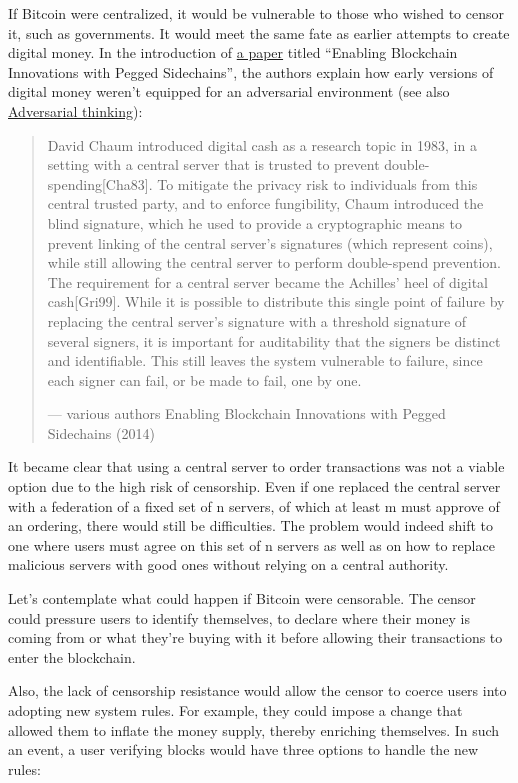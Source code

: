 If Bitcoin were centralized, it would be vulnerable to those who wished
to censor it, such as governments. It would meet the same fate as
earlier attempts to create digital money. In the introduction of
\href{https://www.blockstream.com/sidechains.pdf}{a paper} titled
``Enabling Blockchain Innovations with Pegged Sidechains'', the authors
explain how early versions of digital money weren't equipped for an
adversarial environment (see also
\protect\hyperlink{adversarialthinking}{Adversarial thinking}):

\begin{quote}
David Chaum introduced digital cash as a research topic in 1983, in a
setting with a central server that is trusted to prevent
double-spending{[}Cha83{]}. To mitigate the privacy risk to individuals
from this central trusted party, and to enforce fungibility, Chaum
introduced the blind signature, which he used to provide a cryptographic
means to prevent linking of the central server's signatures (which
represent coins), while still allowing the central server to perform
double-spend prevention. The requirement for a central server became the
Achilles' heel of digital cash{[}Gri99{]}. While it is possible to
distribute this single point of failure by replacing the central
server's signature with a threshold signature of several signers, it is
important for auditability that the signers be distinct and
identifiable. This still leaves the system vulnerable to failure, since
each signer can fail, or be made to fail, one by one.

---  various authors Enabling Blockchain Innovations with Pegged
Sidechains (2014)
\end{quote}

It became clear that using a central server to order transactions was
not a viable option due to the high risk of censorship. Even if one
replaced the central server with a federation of a fixed set of n
servers, of which at least m must approve of an ordering, there would
still be difficulties. The problem would indeed shift to one where users
must agree on this set of n servers as well as on how to replace
malicious servers with good ones without relying on a central authority.

Let's contemplate what could happen if Bitcoin were censorable. The
censor could pressure users to identify themselves, to declare where
their money is coming from or what they're buying with it before
allowing their transactions to enter the blockchain.

Also, the lack of censorship resistance would allow the censor to coerce
users into adopting new system rules. For example, they could impose a
change that allowed them to inflate the money supply, thereby enriching
themselves. In such an event, a user verifying blocks would have three
options to handle the new rules:

